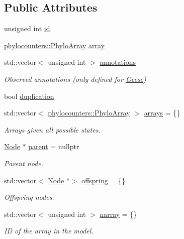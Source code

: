 \subsection*{Public Attributes}
\begin{DoxyCompactItemize}
\item 
unsigned int \hyperlink{class_node_adb90577d9d796c4ccbccf41ce2efc6c9}{id}
\item 
\hyperlink{namespacebarry_1_1counters_1_1phylo_abd293bf65e494e903639fb5fb2c91604}{phylocounters\+::\+Phylo\+Array} \hyperlink{class_node_a86d6575dd1ad7ab0cb02c6e6202b0608}{array}
\item 
std\+::vector$<$ unsigned int $>$ \hyperlink{class_node_aea43a76094980788d1debd3e18ed8070}{annotations}
\begin{DoxyCompactList}\small\item\em Observed annotations (only defined for \hyperlink{class_geese}{Geese}) \end{DoxyCompactList}\item 
bool \hyperlink{class_node_a3129939e8a58c055cb5ad8db8be6b10a}{duplication}
\item 
std\+::vector$<$ \hyperlink{namespacebarry_1_1counters_1_1phylo_abd293bf65e494e903639fb5fb2c91604}{phylocounters\+::\+Phylo\+Array} $>$ \hyperlink{class_node_a269d78db10090d106c697d7c73bac9c7}{arrays} = \{\}
\begin{DoxyCompactList}\small\item\em Arrays given all possible states. \end{DoxyCompactList}\item 
\hyperlink{class_node}{Node} $\ast$ \hyperlink{class_node_ad8184598cdea70e4bbdfd76f2b0f9e85}{parent} = nullptr
\begin{DoxyCompactList}\small\item\em Parent node. \end{DoxyCompactList}\item 
std\+::vector$<$ \hyperlink{class_node}{Node} $\ast$$>$ \hyperlink{class_node_a4e7e9c69da2575cad9c5fb7865dd42c7}{offspring} = \{\}
\begin{DoxyCompactList}\small\item\em Offspring nodes. \end{DoxyCompactList}\item 
std\+::vector$<$ unsigned int $>$ \hyperlink{class_node_a9abaf3f1f5e9c5e383125946b04a15ac}{narray} = \{\}
\begin{DoxyCompactList}\small\item\em ID of the array in the model. \end{DoxyCompactList}\item 
$$
\end{DoxyCompactItemize}
